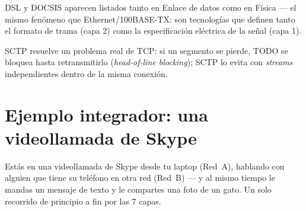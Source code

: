 \documentclass[11pt,a4paper]{article}
\begin{document}
\begin{examfact}
DSL y DOCSIS aparecen listados tanto en Enlace de datos como en Física --- el mismo fenómeno que Ethernet/100BASE-TX: son tecnologías que definen tanto el formato de trama (capa 2) como la especificación eléctrica de la señal (capa 1).
\end{examfact}

\begin{examfact}
SCTP resuelve un problema real de TCP: si un segmento se pierde, TODO se bloquea hasta retransmitirlo (\textit{head-of-line blocking}); SCTP lo evita con \textit{streams} independientes dentro de la misma conexión.
\end{examfact}

\newpage
\section{Ejemplo integrador: una videollamada de Skype}

\begin{analogybox}
Estás en una videollamada de Skype desde tu laptop (Red~A), hablando con alguien que tiene su teléfono en otra red (Red~B) --- y al mismo tiempo le mandas un mensaje de texto y le compartes una foto de un gato. Un solo recorrido de principio a fin por las 7 capas.
\end{analogybox}
\end{document}

